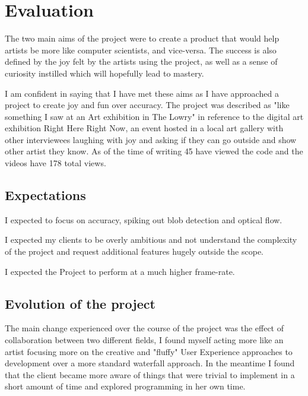 \documentclass[a4paper]{report}
\begin{document}
\chapter{Evaluation}
The two main aims of the project were to create a product that would help artists be more like computer scientists, and vice-versa. The success is also defined by the joy felt by the artists using the project, as well as a sense of curiosity instilled which will hopefully lead to mastery.

I am confident in saying that I have met these aims as I have approached a project to create joy and fun over accuracy. The project was described as "like something I saw at an Art exhibition in The Lowry" in reference to the digital art exhibition Right Here Right Now, an event hosted in a local art gallery with other interviewees laughing with joy and asking if they can go outside and show other artist they know. As of the time of writing 45 have viewed the code and the videos have 178 total views.

\section{Expectations}
I expected to focus on accuracy, spiking out blob detection and optical flow.

I expected my clients to be overly ambitious and not understand the complexity of the project and request additional features hugely outside the scope.

I expected the Project to perform at a much higher frame-rate.

\section{Evolution of the project}
The main change experienced over the course of the project was the effect of collaboration between two different fields, I found myself acting more like an artist focusing more on the creative and "fluffy" User Experience approaches to development over a more standard waterfall approach. In the meantime I found that the client became more aware of things that were trivial to implement in a short amount of time and explored programming in her own time.
\end{document}
